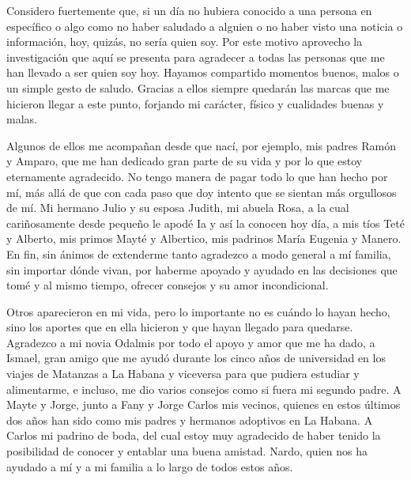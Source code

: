 
\begin{acknowledgements}
	Considero fuertemente que, si un día no hubiera conocido a una persona en específico o algo  como no haber saludado a alguien o no haber visto una noticia o información, hoy, quizás, no sería quien soy. Por este motivo aprovecho la investigación que aquí se presenta para agradecer a todas las personas que me han llevado a ser quien soy hoy. Hayamos compartido momentos buenos, malos o un simple gesto de saludo. Gracias a ellos siempre quedarán las marcas que me hicieron llegar a este punto, forjando mi carácter, físico y cualidades buenas y malas.

	Algunos de ellos me acompañan desde que nací, por ejemplo, mis padres Ramón y Amparo, que me han dedicado gran parte de su vida y por lo que estoy eternamente agradecido. No tengo manera de pagar todo lo que han hecho por mí, más allá de que con cada paso que doy intento que se sientan más orgullosos de mí. Mi hermano Julio y su esposa Judith, mi abuela Rosa, a la cual cariñosamente desde pequeño le apodé Ia y así la conocen hoy día, a mis tíos Teté y Alberto, mis primos Mayté y Albertico, mis padrinos María Eugenia y Manero. En fin, sin ánimos de extenderme tanto agradezco a modo general a mí familia, sin importar dónde vivan, por haberme apoyado y ayudado en las decisiones que tomé y al mismo tiempo, ofrecer consejos y su amor incondicional.

	Otros aparecieron en mi vida, pero lo importante no es cuándo lo hayan
	hecho, sino los aportes que en ella hicieron y que hayan llegado para quedarse. Agradezco a mi novia Odalmis por todo el apoyo y amor que me ha dado, a Ismael, gran amigo que me ayudó durante los cinco años de universidad en los viajes de Matanzas a La Habana y viceversa para que pudiera estudiar y alimentarme, e incluso, me dio varios consejos como si fuera mi segundo padre. A Mayte y Jorge, junto a Fany y Jorge Carlos mis vecinos, quienes en estos últimos dos años han sido como mis padres y hermanos adoptivos en La Habana. A Carlos mi padrino de boda, del cual estoy muy agradecido de haber tenido la posibilidad de conocer y entablar una buena amistad. Nardo, quien nos ha ayudado a mí y a mi familia a lo largo de todos estos años.


\end{acknowledgements}
